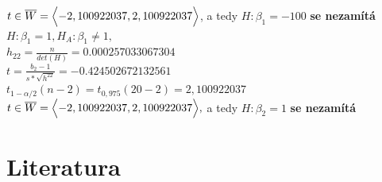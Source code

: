 \documentclass[11pt,a4paper]{article}
\newcommand\ddfrac[2]{\frac{\displaystyle #1}{\displaystyle #2}}
\begin{document}
$ t \in \overline{W} = \Bigl< -2,100922037, 2,100922037 \Bigr> $, a tedy $ H : \beta_1 = -100 $ \textbf{se nezamítá} \\

$ H: \beta_1 = 1, H_A : \beta_1 \ne 1, $ \\

$ h_{22} = \ddfrac{n}{det(H)} = 0.000257033067304 $ \\

$ t = \ddfrac{b_2 - 1}{s * \sqrt{h^22}} = -0.424502672132561 $ \\

$ t_{1-\alpha/2} (n - 2) = t_{0,975} (20 - 2) = 2,100922037 $ \\

$ t \in \overline{W} = \Bigl< -2,100922037, 2,100922037 \Bigr>, $ a tedy $ H : \beta_2 = 1 $ \textbf{se nezamítá} \\

\noindent\makebox[\linewidth]{\rule{\textwidth}{0.4pt}}
\newpage








\section{Literatura}

\begin{flushleft}
    
\end{flushleft}
\end{document}
